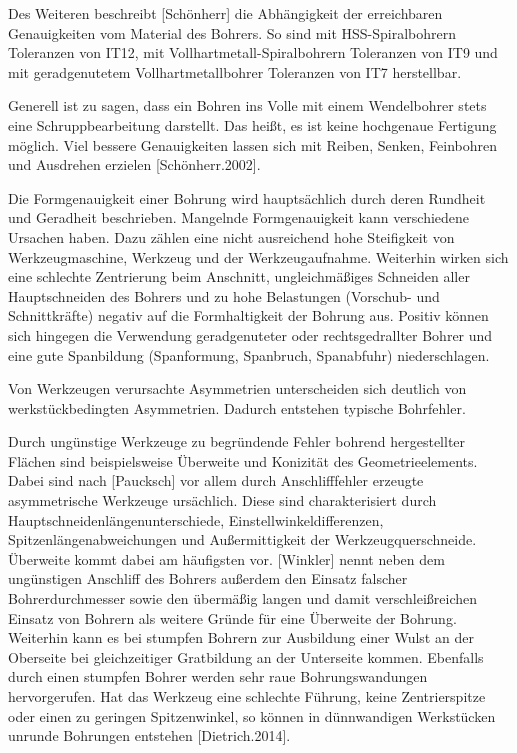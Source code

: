 Des Weiteren beschreibt [Schönherr] die Abhängigkeit der erreichbaren Genauigkeiten vom Material des Bohrers. So sind mit HSS-Spiralbohrern Toleranzen von IT12, mit Vollhartmetall-Spiralbohrern Toleranzen von IT9 und mit geradgenutetem Vollhartmetallbohrer Toleranzen von IT7 herstellbar. 

Generell ist zu sagen, dass ein Bohren ins Volle mit einem Wendelbohrer stets eine Schruppbearbeitung darstellt. Das heißt, es ist keine hochgenaue Fertigung möglich. Viel bessere Genauigkeiten lassen sich mit Reiben, Senken, Feinbohren und Ausdrehen erzielen [Schönherr.2002].

Die Formgenauigkeit einer Bohrung wird hauptsächlich durch deren Rundheit und Geradheit beschrieben. Mangelnde Formgenauigkeit kann verschiedene Ursachen haben. Dazu zählen eine nicht ausreichend hohe Steifigkeit von Werkzeugmaschine, Werkzeug und der Werkzeugaufnahme. Weiterhin wirken sich eine schlechte Zentrierung beim Anschnitt, ungleichmäßiges Schneiden aller Hauptschneiden des Bohrers und zu hohe Belastungen (Vorschub- und Schnittkräfte) negativ auf die Formhaltigkeit der Bohrung aus. Positiv können sich hingegen die Verwendung geradgenuteter oder rechtsgedrallter Bohrer und eine gute Spanbildung (Spanformung, Spanbruch, Spanabfuhr) niederschlagen. 

Von Werkzeugen verursachte Asymmetrien unterscheiden sich deutlich von werkstückbedingten Asymmetrien. Dadurch entstehen typische Bohrfehler.

Durch ungünstige Werkzeuge zu begründende Fehler bohrend hergestellter Flächen sind beispielsweise Überweite und Konizität des Geometrieelements. Dabei sind nach [Paucksch] vor allem durch Anschlifffehler erzeugte asymmetrische Werkzeuge ursächlich. Diese sind charakterisiert durch Hauptschneidenlängenunterschiede, Einstellwinkeldifferenzen, Spitzenlängenabweichungen und Außermittigkeit der Werkzeugquerschneide.
Überweite kommt dabei am häufigsten vor. [Winkler] nennt neben dem ungünstigen Anschliff des Bohrers außerdem den Einsatz falscher Bohrerdurchmesser sowie den übermäßig langen und damit verschleißreichen Einsatz von Bohrern als weitere Gründe für eine Überweite der Bohrung. 
Weiterhin kann es bei stumpfen Bohrern zur Ausbildung einer Wulst an der Oberseite bei gleichzeitiger Gratbildung an der Unterseite kommen. Ebenfalls durch einen stumpfen Bohrer werden sehr raue Bohrungswandungen hervorgerufen. 
Hat das Werkzeug eine schlechte Führung, keine Zentrierspitze oder einen zu geringen Spitzenwinkel, so können in dünnwandigen Werkstücken unrunde Bohrungen entstehen [Dietrich.2014].

